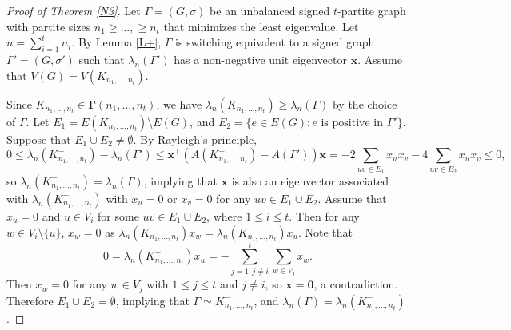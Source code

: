 \documentclass[12pt]{article}
\numberwithin{equation}{section}
\begin{document}
\begin{proof} [Proof of Theorem \ref{N3}]
Let $\Gamma=(G, \sigma)$ be an unbalanced signed $t$-partite graph with partite sizes $n_1\ge \dots, \ge n_t$ that minimizes the least eigenvalue. 
Let $n=\sum_{i=1}^{t}n_i$. 
By Lemma \ref{L+},  $\Gamma$ is switching equivalent to
a signed graph $\Gamma'=(G,\sigma')$  such that $\lambda_n(\Gamma')$ has a non-negative unit eigenvector $\mathbf{x}$. Assume that $V(G)=V(K_{n_1, \dots, n_t})$.


Since $K_{n_1, \dots, n_t}^-\in \boldsymbol\Gamma(n_1,\dots, n_t)$, we have $\lambda_n(K_{n_1, \dots, n_t}^-)\ge\lambda_n(\Gamma)$ by the choice of $\Gamma$. 
Let $E_1=E(K_{n_1, \dots, n_t})\setminus E(G)$, and 
$E_2=\{e\in E(G): \mbox{$e$ is positive in $\Gamma'$}\}$. 
Suppose that $E_1\cup E_2\ne \emptyset$. 
By Rayleigh's principle,  
\[
0\le \lambda_n(K_{n_1, \dots, n_t}^-)-\lambda_n(\Gamma')\le \mathbf{x}^\top\left(A(K_{n_1, \dots, n_t}^-)-A(\Gamma')\right)\mathbf{x}=-2\sum_{uv\in E_1}x_ux_v-4\sum_{uv\in E_2}x_ux_v\le 0,  
\]
so $\lambda_n(K_{n_1, \dots, n_t}^-)=\lambda_n(\Gamma)$, implying that $\mathbf{x}$ is also an eigenvector associated with $\lambda_n(K_{n_1,\dots,n_t}^-)$ with $x_u=0$ or $x_v=0$ for any $uv\in E_1\cup E_2$. Assume that $x_u=0$ and $u\in V_i$ for some $uv\in E_1\cup E_2$, where $1\le i\le t$. 
Then for any $w\in V_i\setminus\{u\}$, $x_w=0$ as $\lambda_n(K_{n_1,\dots,n_t}^-)x_w=\lambda_n(K_{n_1,\dots,n_t}^-)x_u$. 
Note that
\[
0=\lambda_n(K_{n_1,\dots,n_t}^-)x_u=-\sum_{j=1,j\ne i}^t\sum_{w\in V_j}x_w. 
\]
Then $x_w=0$ for any $w\in V_j$ with $1\le j\le t$ and $j\ne i$, so $\mathbf{x}=\mathbf{0}$, a contradiction. 
Therefore $E_1\cup E_2=\emptyset$, implying that $\Gamma\simeq K_{n_1, \dots, n_t}^-$, and $\lambda_n(\Gamma)=\lambda_n\left(K_{n_1, \dots, n_t}^-\right)$.
%
%

\end{proof}
\end{document}

